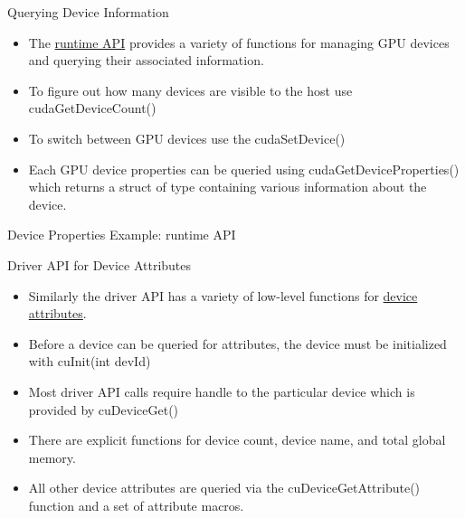 \documentclass[handout]{beamer}
\begin{document}
\begin{frame}{Querying Device Information}
\begin{itemize}
\itemsep1em
	\item<1->The \href{http://docs.nvidia.com/cuda/cuda-runtime-api/index.html}{\color{blue}runtime API} provides a variety of functions for managing GPU devices and querying their associated information.
	\item<1->To figure out how many devices are visible to the host use {\selectfont cudaGetDeviceCount()} 
	\item<1->To switch between GPU devices use the {\selectfont cudaSetDevice()}
	\item<1->Each GPU device properties can be queried using {\selectfont cudaGetDeviceProperties()} which returns a struct of type \href{http://docs.nvidia.com/cuda/cuda-runtime-api/structcudaDeviceProp.html}{} containing various information about the device.
\end{itemize}
\end{frame}

\begin{frame}[fragile]{Device Properties Example: runtime API}

\end{frame}

\begin{frame}{Driver API for Device Attributes}
\begin{itemize}
\itemsep1em
	\item<1-> Similarly the driver API has a variety of low-level functions for \href{http://docs.nvidia.com/cuda/cuda-driver-api/group__CUDA__DEVICE.html}{\color{blue}device attributes}.
	\item<1->Before a device can be queried for attributes, the device must be initialized with  {\selectfont cuInit(int devId)}
	\item<1->Most driver API calls require handle to the particular device which is provided by {\selectfont cuDeviceGet()}
	\item<1->There are explicit functions for device count, device name, and total global memory.
	\item<1->All other device attributes are queried via the {\selectfont cuDeviceGetAttribute()} function and a set of attribute macros.
\end{itemize}
\end{frame}
\end{document}
